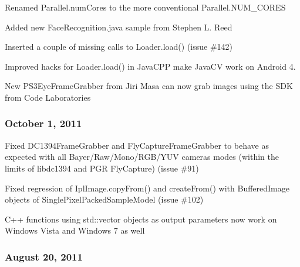 \begin{DoxyItemize}
\item Renamed {\ttfamily Parallel.\+num\+Cores} to the more conventional {\ttfamily Parallel.\+N\+U\+M\+\_\+\+C\+O\+R\+E\+S}
\item Added new {\ttfamily Face\+Recognition.\+java} sample from Stephen L. Reed
\item Inserted a couple of missing calls to {\ttfamily Loader.\+load()} (issue \#142)
\item Improved hacks for {\ttfamily Loader.\+load()} in Java\+C\+P\+P make Java\+C\+V work on Android 4.
\item New {\ttfamily P\+S3\+Eye\+Frame\+Grabber} from Jiri Masa can now grab images using the S\+D\+K from Code Laboratories
\end{DoxyItemize}

\subsubsection*{October 1, 2011}


\begin{DoxyItemize}
\item Fixed {\ttfamily D\+C1394\+Frame\+Grabber} and {\ttfamily Fly\+Capture\+Frame\+Grabber} to behave as expected with all Bayer/\+Raw/\+Mono/\+R\+G\+B/\+Y\+U\+V cameras modes (within the limits of libdc1394 and P\+G\+R Fly\+Capture) (issue \#91)
\item Fixed regression of {\ttfamily Ipl\+Image.\+copy\+From()} and {\ttfamily create\+From()} with {\ttfamily Buffered\+Image} objects of {\ttfamily Single\+Pixel\+Packed\+Sample\+Model} (issue \#102)
\item C++ functions using {\ttfamily std\+::vector} objects as output parameters now work on Windows Vista and Windows 7 as well
\end{DoxyItemize}

\subsubsection*{August 20, 2011}


